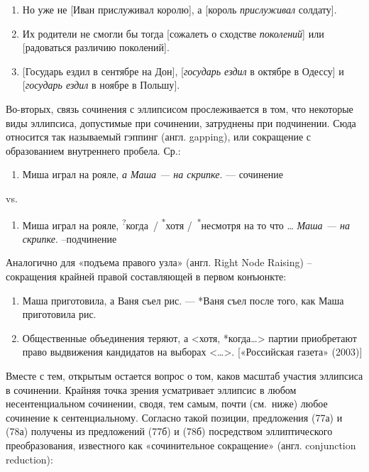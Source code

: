 \begin{enumerate}
\def\labelenumi{(\arabic{enumi})}
\setcounter{enumi}{69}
\item
  Но уже не {[}Иван прислуживал королю{]}, а {[}король
  \textit{прислуживал} солдату{]}.
\item
  Их родители не смогли бы тогда {[}сожалеть о сходстве
  \textit{поколений}{]} или {[}радоваться различию поколений{]}.
\item
  {[}Государь ездил в сентябре на Дон{]}, {[}\textit{государь ездил} в
  октябре в Одессу{]} и {[}\textit{государь ездил} в ноябре в Польшу{]}.
\end{enumerate}

Во-вторых, связь сочинения с эллипсисом прослеживается в том, что
некоторые виды эллипсиса, допустимые при сочинении, затруднены при
подчинении. Сюда относится так называемый гэппинг (англ. gapping), или
сокращение с образованием внутреннего пробела. Ср.:

\begin{enumerate}
\def\labelenumi{(\arabic{enumi})}
\setcounter{enumi}{72}
\item
  Миша играл на рояле, \textit{а Маша --- на скрипке}. --- сочинение
\end{enumerate}

vs.

\begin{enumerate}
\def\labelenumi{(\arabic{enumi})}
\setcounter{enumi}{73}
\item
  Миша играл на рояле, \textsuperscript{?}когда~/
  \textsuperscript{*}хотя /~\textsuperscript{*}несмотря на то что
  \ldots{} \textit{Маша --- на скрипке}. --подчинение
\end{enumerate}

Аналогично для «подъема правого узла» (англ. Right Node Raising) --
сокращения крайней правой составляющей в первом конъюнкте:

\begin{enumerate}
\def\labelenumi{(\arabic{enumi})}
\setcounter{enumi}{74}
\item
  Маша приготовила, а Ваня съел рис. --- *Ваня съел после того, как Маша
  приготовила рис.
\item
  Общественные объединения теряют, а \textless*хотя,
  *когда\ldots\textgreater{} партии приобретают право выдвижения
  кандидатов на выборах \textless\ldots\textgreater. {[}«Российская
  газета» (2003){]}
\end{enumerate}

Вместе с тем, открытым остается вопрос о том, каков масштаб участия
эллипсиса в сочинении. Крайняя точка зрения усматривает эллипсис в любом
несентенциальном сочинении, сводя, тем самым, почти (см.~ниже) любое
сочинение к сентенциальному. Согласно такой позиции, предложения (77а) и
(78а) получены из предложений (77б) и (78б) посредством эллиптического
преобразования, известного как «сочинительное сокращение» (англ.
conjunction reduction):

